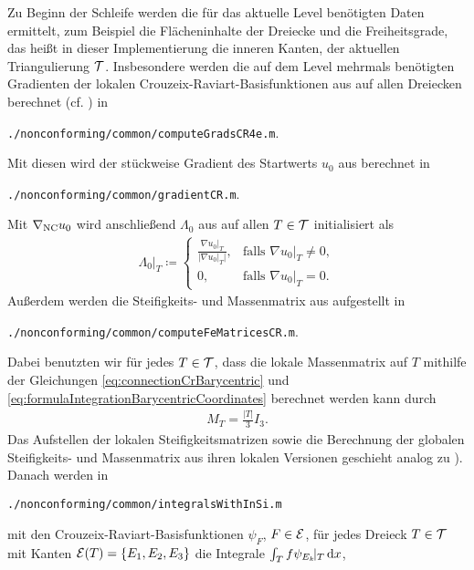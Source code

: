 Zu Beginn der Schleife werden die für das aktuelle Level benötigten Daten
ermittelt, zum Beispiel die Flächeninhalte der Dreiecke und die Freiheitsgrade,
das heißt in dieser Implementierung die inneren Kanten, der aktuellen
Triangulierung $\mathcal{T}$. 
Insbesondere werden die auf dem Level mehrmals benötigten Gradienten der
lokalen Crouzeix-Raviart-Basisfunktionen aus
 auf allen Dreiecken berechnet (cf.
\cite[Abschnitt 1.4.2]{CGKNRR10}) in
\begin{center}
  \texttt{./nonconforming/common/computeGradsCR4e.m}.
\end{center}
Mit diesen wird der stückweise Gradient des Startwerts $u_0$ aus
 berechnet in
\begin{center}
  \texttt{./nonconforming/common/gradientCR.m}.
\end{center}
Mit $\nabla_\textup{NC} u_0$ wird anschließend $\Lambda_0$ aus
 auf allen $T\in\mathcal{T}$ initialisiert als 
\begin{align*}
  \Lambda_0|_T\coloneqq
  \begin{cases}
    \frac{\nabla u_0|_T}{|\nabla u_0|_T|},&\text{falls }\nabla u_0|_T\neq 0,\\
    0,&\text{falls }\nabla u_0|_T= 0.
  \end{cases}
\end{align*}
Außerdem werden die Steifigkeits- und Massenmatrix aus
 aufgestellt in
\begin{center}
  \texttt{./nonconforming/common/computeFeMatricesCR.m}.
\end{center}
Dabei benutzten wir für jedes $T\in\mathcal{T}$, dass die lokale Massenmatrix auf
$T$ mithilfe der Gleichungen
\eqref{eq:connectionCrBarycentric} und
\eqref{eq:formulaIntegrationBarycentricCoordinates}
berechnet werden kann durch
\begin{align}
  \label{eq:localMassmatrix}
  M_T
  =
  \frac{|T|}{3}I_3.
\end{align}
Das Aufstellen der lokalen Steifigkeitsmatrizen sowie die Berechnung der
globalen Stei\-fig\-keits- und Massenmatrix aus ihren lokalen Versionen geschieht
analog zu \cite[Abschnitt 1.4.2]{CGKNRR10}).
Danach werden in
\begin{center}
  \texttt{./nonconforming/common/integralsWithInSi.m}
\end{center}
mit den Crouzeix-Raviart-Basisfunktionen
$\psi_F$, $F\in\mathcal{E}$, für jedes Dreieck $T\in\mathcal{T}$ mit Kanten
$\mathcal{E}(T)=\{E_1,E_2,E_3\}$ die Integrale $\int_T f\psi_{E_k}\!|_T\,\mathrm{d}x$,
